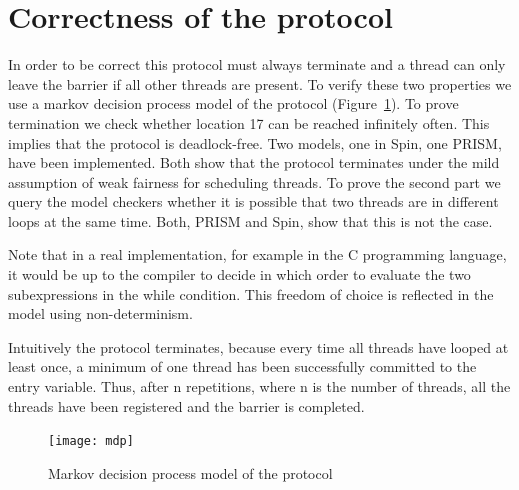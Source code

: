 \documentclass[a4paper, 10pt]{article}
\begin{document}
\section{Correctness of the protocol}
\label{sec:correctness}
In order to be correct this protocol must always terminate and a thread can only leave the barrier if all other threads are present. To verify these two properties we use a markov decision process model of the protocol (Figure~\ref{fig:mdp}). To prove termination we check whether location 17 can be reached infinitely often. This implies that the protocol is deadlock-free. Two models, one in Spin\cite{spin}, one PRISM\cite{prism}, have been implemented. Both show that the protocol terminates under the mild assumption of weak fairness for scheduling threads. To prove the second part we query the model checkers whether it is possible that two threads are in different loops at the same time. Both, PRISM and Spin, show that this is not the case.

Note that in a real implementation, for example in the C programming language, it would be up to the compiler to decide in which order to evaluate the two subexpressions in the while condition. This freedom of choice is reflected in the model using non-determinism.

Intuitively the protocol terminates, because every time all threads have looped at least once, a minimum of one thread has been successfully committed to the entry variable. Thus, after n repetitions, where n is the number of threads, all the threads have been registered and the barrier is completed.

\begin{figure}[htbp]
	\centering
	\texttt{[image: mdp]}
	\caption{Markov decision process model of the protocol}
	\label{fig:mdp}
\end{figure}

\clearpage

\end{document}
